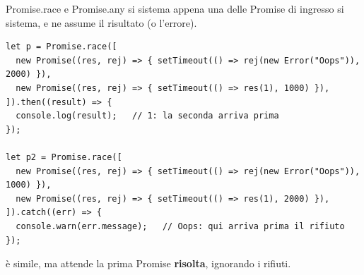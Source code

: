 \begin{esempio}{Promise.race e Promise.any}
 si sistema appena una delle Promise di ingresso si sistema,
e ne assume il risultato (o l'errore).

\begin{affianco}[0.62][c]
\codicepiccolo
\begin{lstlisting}[style=js, name=promise-race.js]
let p = Promise.race([
  new Promise((res, rej) => { setTimeout(() => rej(new Error("Oops")), 2000) }),
  new Promise((res, rej) => { setTimeout(() => res(1), 1000) }),
]).then((result) => {
  console.log(result);   // 1: la seconda arriva prima
});

let p2 = Promise.race([
  new Promise((res, rej) => { setTimeout(() => rej(new Error("Oops")), 1000) }),
  new Promise((res, rej) => { setTimeout(() => res(1), 2000) }),
]).catch((err) => {
  console.warn(err.message);   // Oops: qui arriva prima il rifiuto
});
\end{lstlisting}
\risultato
\begin{immagine}
\end{immagine}
\end{affianco}

 è simile, ma attende la prima Promise \textbf{risolta},
ignorando i rifiuti.


\end{esempio}
